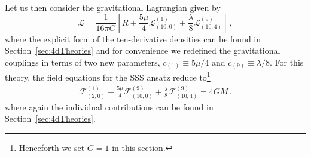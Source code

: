 \documentclass[11pt]{article}
\begin{document}
{%
Let us then consider the gravitational Lagrangian given by%
\begin{equation}
\mathcal{L}=\frac{1}{16\pi G} \left[R +  \frac{5 \mu}{4} \mathcal{L}_{(10, 0)}^{(1)}  + \frac{\lambda}{8} \mathcal{L}_{(10, 4)}^{(9)}  \right]\, ,
\end{equation}
where the explicit form of the ten-derivative densities can be found in Section~\ref{sec:4dTheories} and for convenience we redefined the gravitational couplings in terms of two new parameters, $c_{(1)}\equiv 5\mu/4$ and $c_{(9)}\equiv \lambda/8$.
For this theory, the  field equations for the SSS ansatz reduce to\footnote{Henceforth we set $G = 1$ in this section.}
\begin{align}
\mathcal{F}_{(2, 0)}^{(1)} +  \frac{5 \mu}{4} \mathcal{F}_{(10, 0)}^{(9)}  + \frac{\lambda}{8} \mathcal{F}_{(10, 4)}^{(9)} = 4 G M \, .
\end{align}
where again the individual contributions can be found in Section~\ref{sec:4dTheories}. 

}
\end{document}
